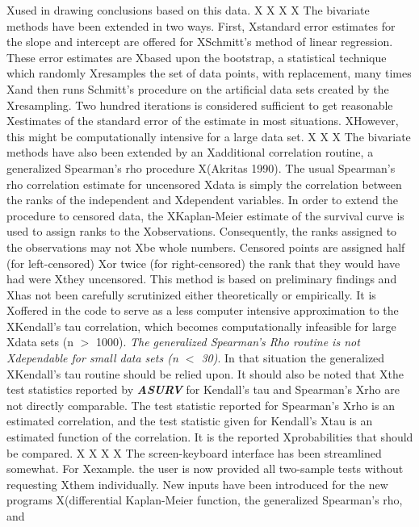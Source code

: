 Xused in drawing conclusions based on this data.
X
X
X
X     The bivariate methods have been extended in two ways.  First,
Xstandard error estimates for the slope and intercept are offered for
XSchmitt's method of linear regression.  These error estimates are
Xbased upon the bootstrap, a statistical technique which randomly 
Xresamples the set of data points, with replacement, many times
Xand then runs Schmitt's procedure on the artificial data sets created by the
Xresampling.  Two hundred iterations is considered sufficient to get reasonable 
Xestimates of the standard error of the estimate in most situations.  
XHowever, this might be computationally intensive for a large data set.
X
X     
X     The bivariate methods have also been extended by an
Xadditional correlation routine, a generalized Spearman's rho procedure 
X(Akritas 1990).  The usual Spearman's rho correlation estimate for uncensored 
Xdata is simply the correlation between the ranks of the independent and 
Xdependent variables.  In order to extend the procedure to censored data, the
XKaplan-Meier estimate of the survival curve is used to assign ranks to the
Xobservations.  Consequently, the ranks assigned to the observations may not 
Xbe whole numbers.  Censored points are assigned half (for left-censored)
Xor twice (for right-censored) the rank that they would have had were
Xthey uncensored.  This method is based on preliminary findings and 
Xhas not been carefully scrutinized either theoretically or empirically.  It is
Xoffered in the code to serve as a less computer intensive approximation to the
XKendall's tau correlation, which becomes computationally infeasible for large 
Xdata sets (n $>$ 1000).  {\it The generalized Spearman's Rho routine is not 
Xdependable for small data sets (n $<$ 30)}.  In that situation the generalized
XKendall's tau routine should be relied upon.  It should also be noted that 
Xthe test statistics reported by {\sl\bf ASURV} for Kendall's tau and Spearman's
Xrho are not directly comparable.  The test statistic reported for Spearman's
Xrho is an estimated correlation, and the test statistic given for Kendall's
Xtau is an estimated function of the correlation.  It is the reported
Xprobabilities that should be compared.
X
X
X
X     The screen-keyboard interface has been streamlined somewhat.  For
Xexample. the user is now provided all two-sample tests without requesting 
Xthem individually.  New inputs have been introduced for the new programs
X(differential Kaplan-Meier function, the generalized Spearman's rho, and
